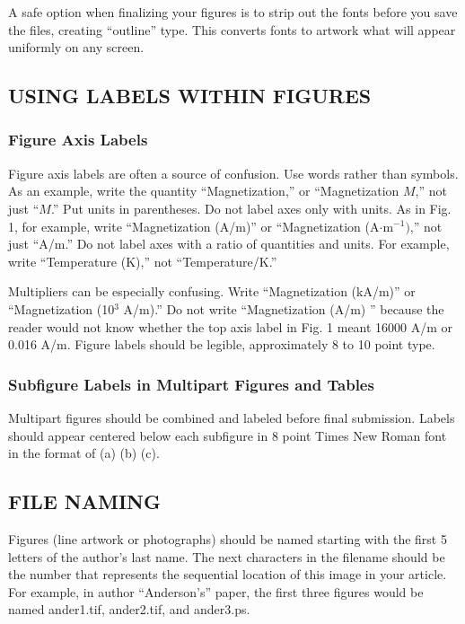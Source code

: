 \documentclass{IEEEoj-data}
\begin{document}
{A safe option when finalizing your figures is to strip out the fonts before 
you save the files, creating ``outline'' type. This converts fonts to 
artwork what will appear uniformly on any screen.

\subsection*{USING LABELS WITHIN FIGURES}
\setcounter{subsubsection}{0}
\subsubsection{Figure Axis Labels}
Figure axis labels are often a source of confusion. Use words rather than 
symbols. As an example, write the quantity ``Magnetization,'' or 
``Magnetization $M$,'' not just ``$M$.'' Put units in parentheses. Do not label 
axes only with units. As in Fig. 1, for example, write ``Magnetization 
(A/m)'' or ``Magnetization (A$\cdot $m$^{-1})$,'' not just ``A/m.'' Do not 
label axes with a ratio of quantities and units. For example, write 
``Temperature (K),'' not ``Temperature/K.'' 

Multipliers can be especially confusing. Write ``Magnetization (kA/m)'' or 
``Magnetization (10$^{3}$ A/m).'' Do not write ``Magnetization (A/m) 
'' because the reader would not know whether the top axis 
label in Fig. 1 meant 16000 A/m or 0.016 A/m. Figure labels should be 
legible, approximately 8 to 10 point type.

\subsubsection{Subfigure Labels in Multipart Figures and Tables}
Multipart figures should be combined and labeled before final submission. 
Labels should appear centered below each subfigure in 8 point Times New 
Roman font in the format of (a) (b) (c). 

\subsection*{FILE NAMING}
Figures (line artwork or photographs) should be named starting with the 
first 5 letters of the author's last name. The next characters in the 
filename should be the number that represents the sequential location of 
this image in your article. For example, in author ``Anderson's'' paper, the 
first three figures would be named ander1.tif, ander2.tif, and ander3.ps.

}
\end{document}

